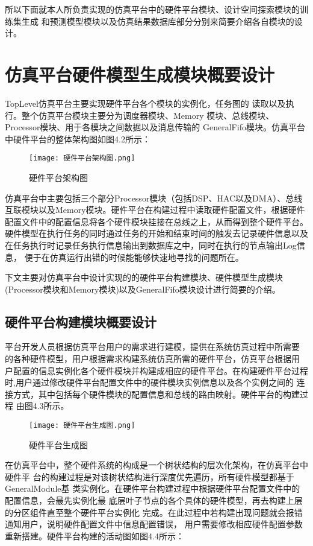 所以下面就本人所负责实现的仿真平台中的硬件平台模块、设计空间探索模块的训练集生成
和预测模型模块以及仿真结果数据库部分分别来简要介绍各自模块的设计。

\section{仿真平台硬件模型生成模块概要设计}
TopLevel仿真平台主要实现硬件平台各个模块的实例化，任务图的
读取以及执行。整个仿真平台模块主要分为调度器模块、Memory
模块、总线模块、Processor模块、用于各模块之间数据以及消息传输的
GeneralFifo模块。仿真平台中硬件平台的整体架构图如图4.2所示：

\begin{figure}[h]
    \centering
    \texttt{[image: 硬件平台架构图.png]}
    \caption{硬件平台架构图}
    \label{fig:badge}
\end{figure}

仿真平台中主要包括三个部分Processor模块（包括DSP、HAC以及DMA）、总线
互联模块以及Memory模块。硬件平台在构建过程中读取硬件配置文件，根据硬件
配置文件中的配置信息将各个硬件模块挂接在总线之上，从而得到整个硬件平台。
硬件模型在执行任务的同时通过任务的开始和结束时间的触发去记录硬件信息以及
在任务执行时记录任务执行信息输出到数据库之中，同时在执行的节点输出Log信息，
便于在仿真运行出错的时候能能够快速地寻找的问题所在。

下文主要对仿真平台中设计实现的的硬件平台构建模块、硬件模型生成模块
(Processor模块和Memory模块)以及GeneralFifo模块设计进行简要的介绍。

\subsection{硬件平台构建模块概要设计}
平台开发人员根据仿真平台用户的需求进行建模，提供在系统仿真过程中所需要
的各种硬件模型，用户根据需求构建系统仿真所需的硬件平台，仿真平台根据用
户配置的信息实例化各个硬件模块并构建成相应的硬件平台。在构建硬件平台过程
时,用户通过修改硬件平台配置文件中的硬件模块实例信息以及各个实例之间的
连接方式，其中包括每个硬件模块的配置信息和总线的路由映射。硬件平台的构建过程
由图4.3所示。

\begin{figure}[h]
    \centering
    \texttt{[image: 硬件平台生成图.png]}
    \caption{硬件平台生成图}
    \label{fig:badge}
\end{figure}

在仿真平台中，整个硬件系统的构成是一个树状结构的层次化架构，在仿真平台中硬件平
台的构建过程是对该树状结构进行深度优先遍历，所有硬件模型都基于GeneralModule基
类实例化。在硬件平台构建过程中根据硬件平台配置文件中的配置信息，会最先实例化最
底层叶子节点的各个具体的硬件模型，再去构建上层的分区组件直至整个硬件平台实例化
完成。在此过程中若构建出现问题就会报错通知用户，说明硬件配置文件中信息配置错误，
用户需要修改相应硬件配置参数重新搭建。硬件平台构建的活动图如图4.4所示：

